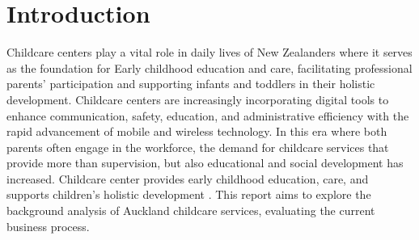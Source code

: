 \section{Introduction}
\par
Childcare centers play a vital role in daily lives of New Zealanders where it serves as the foundation for Early childhood education and care, facilitating professional parents' participation and supporting infants and toddlers in their holistic development. Childcare centers are increasingly incorporating digital tools to enhance communication, safety, education, and administrative efficiency with the rapid advancement of mobile and wireless technology. In this era where both parents often engage in the workforce, the demand for childcare services that provide more than supervision, but also educational and social development has increased. Childcare center provides early childhood education, care, and supports children’s holistic development \cite{duhn2014making}. This report aims to explore the background analysis of Auckland childcare services, evaluating the current business process.
